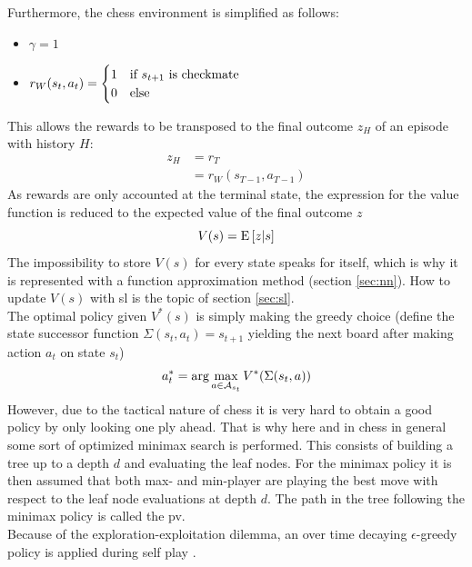 \documentclass[twocolumn]{phdsymp} %
\begin{document}
Furthermore, the chess environment is simplified as follows:
\begin{itemize}
\item $\gamma=1$
\item $r_W(s_t,a_t) = \begin{cases} 
   1 & \text{if } s_{t+1} \textnormal{ is checkmate}\\
   0 &  \textnormal{else} \\
  \end{cases}$
\end{itemize}

This allows the rewards to be transposed to the final outcome $z_H$ of an episode with history $H$:
\begin{align}
z_H&=r_T \\
&=r_W(s_{T-1},a_{T-1})
\end{align}
As rewards are only accounted at the terminal state, the expression for the value function is reduced to the expected value of the final outcome $z$
\begin{equation}
V(s) = \textnormal{E}\left[z|s\right]
\end{equation}
The impossibility to store $V(s)$ for every state speaks for itself, which is why it is represented with a function approximation method (section \ref{sec:nn}). How to update $V(s)$ with \gls{sl} is the topic of section \ref{sec:sl}.\\

The optimal policy given $V^*(s)$ is simply making the greedy choice (define the state successor function $\Sigma(s_t,a_t)=s_{t+1}$ yielding the next board after making action $a_t$ on state $s_t$)
\begin{equation}
a_{t}^*=\textnormal{arg} \max_{a\in{\mathcal{A}}_{s_t}} V^*(\Sigma(s_t,a))
\end{equation}
However, due to the tactical nature of chess it is very hard to obtain a good policy by only looking one ply ahead. That is why here and in chess in general some sort of optimized minimax search is performed. This consists of building a tree up to a depth $d$ and evaluating the leaf nodes. For the minimax policy it is then assumed that both max- and min-player are playing the best move with respect to the leaf node evaluations at depth $d$. The path in the tree following the minimax policy is called the \gls{pv}. \\
Because of the exploration-exploitation dilemma, an over time decaying $\epsilon$-greedy policy is applied during self play \cite{rl}.
\end{document}
